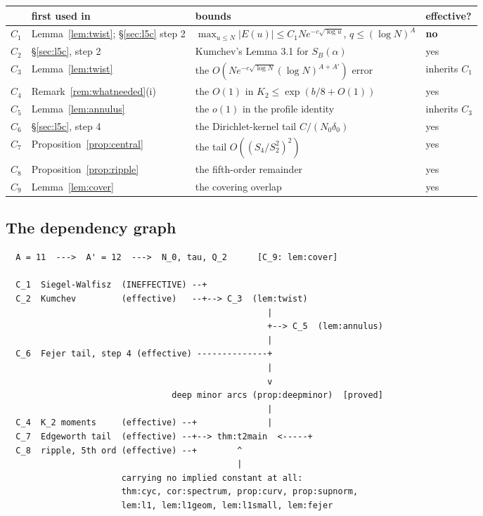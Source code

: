 \documentclass[11pt,a4paper]{article}
\theoremstyle{plain}
\theoremstyle{definition}
\theoremstyle{remark}
\begin{document}
\begin{center}
\begin{tabular}{llll}
\toprule
& first used in & bounds & effective?\\
\midrule
$C_1$ & Lemma~\ref{lem:twist}; \S\ref{sec:l5c} step 2
  & $\max_{u\le N}|E(u)|\le C_1Ne^{-c\sqrt{\log u}}$, $q\le(\log N)^{A}$
  & \textbf{no}\\
$C_2$ & \S\ref{sec:l5c}, step 2
  & Kumchev's Lemma 3.1 for $S_B(\alpha)$ & yes\\
$C_3$ & Lemma~\ref{lem:twist}
  & the $O(Ne^{-c\sqrt{\log N}}(\log N)^{A+A'})$ error & inherits $C_1$\\
$C_4$ & Remark~\ref{rem:whatneeded}(i)
  & the $O(1)$ in $K_2\le\exp(b/8+O(1))$ & yes\\
$C_5$ & Lemma~\ref{lem:annulus} & the $o(1)$ in the profile identity
  & inherits $C_3$\\
$C_6$ & \S\ref{sec:l5c}, step 4 & the Dirichlet-kernel tail $C/(N_0\delta_0)$
  & yes\\
$C_7$ & Proposition~\ref{prop:central} & the tail $O((S_4/S_2^{2})^{2})$ & yes\\
$C_8$ & Proposition~\ref{prop:ripple} & the fifth-order remainder & yes\\
$C_9$ & Lemma~\ref{lem:cover} & the covering overlap & yes\\
\bottomrule
\end{tabular}
\end{center}

\subsection{The dependency graph}

\begin{verbatim}
  A = 11  --->  A' = 12  --->  N_0, tau, Q_2      [C_9: lem:cover]

  C_1  Siegel-Walfisz  (INEFFECTIVE) --+
  C_2  Kumchev         (effective)   --+--> C_3  (lem:twist)
                                                    |
                                                    +--> C_5  (lem:annulus)
                                                    |
  C_6  Fejer tail, step 4 (effective) --------------+
                                                    |
                                                    v
                                 deep minor arcs (prop:deepminor)  [proved]
                                                    |
  C_4  K_2 moments     (effective) --+              |
  C_7  Edgeworth tail  (effective) --+--> thm:t2main  <-----+
  C_8  ripple, 5th ord (effective) --+        ^
                                              |
                       carrying no implied constant at all:
                       thm:cyc, cor:spectrum, prop:curv, prop:supnorm,
                       lem:l1, lem:l1geom, lem:l1small, lem:fejer
\end{verbatim}
\end{document}
